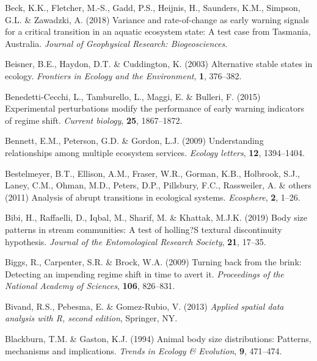 \documentclass[print]{nuthesis}
\begin{document}
\leavevmode\hypertarget{ref-beck_variance_2018}{}%
Beck, K.K., Fletcher, M.-S., Gadd, P.S., Heijnis, H., Saunders, K.M., Simpson, G.L. \& Zawadzki, A. (2018) Variance and rate-of-change as early warning signals for a critical transition in an aquatic ecosystem state: A test case from Tasmania, Australia. \emph{Journal of Geophysical Research: Biogeosciences}.

\leavevmode\hypertarget{ref-beisner2003alternative}{}%
Beisner, B.E., Haydon, D.T. \& Cuddington, K. (2003) Alternative stable states in ecology. \emph{Frontiers in Ecology and the Environment}, \textbf{1}, 376--382.

\leavevmode\hypertarget{ref-benedetti2015experimental}{}%
Benedetti-Cecchi, L., Tamburello, L., Maggi, E. \& Bulleri, F. (2015) Experimental perturbations modify the performance of early warning indicators of regime shift. \emph{Current biology}, \textbf{25}, 1867--1872.

\leavevmode\hypertarget{ref-bennett2009understanding}{}%
Bennett, E.M., Peterson, G.D. \& Gordon, L.J. (2009) Understanding relationships among multiple ecosystem services. \emph{Ecology letters}, \textbf{12}, 1394--1404.

\leavevmode\hypertarget{ref-bestelmeyer_analysis_2011}{}%
Bestelmeyer, B.T., Ellison, A.M., Fraser, W.R., Gorman, K.B., Holbrook, S.J., Laney, C.M., Ohman, M.D., Peters, D.P., Pillsbury, F.C., Rassweiler, A. \& others (2011) Analysis of abrupt transitions in ecological systems. \emph{Ecosphere}, \textbf{2}, 1--26.

\leavevmode\hypertarget{ref-bibi2019body}{}%
Bibi, H., Raffaelli, D., Iqbal, M., Sharif, M. \& Khattak, M.J.K. (2019) Body size patterns in stream communities: A test of holling?S textural discontinuity hypothesis. \emph{Journal of the Entomological Research Society}, \textbf{21}, 17--35.

\leavevmode\hypertarget{ref-biggs2009turning}{}%
Biggs, R., Carpenter, S.R. \& Brock, W.A. (2009) Turning back from the brink: Detecting an impending regime shift in time to avert it. \emph{Proceedings of the National Academy of Sciences}, \textbf{106}, 826--831.

\leavevmode\hypertarget{ref-sp2}{}%
Bivand, R.S., Pebesma, E. \& Gomez-Rubio, V. (2013) \emph{Applied spatial data analysis with R, second edition}, Springer, NY.

\leavevmode\hypertarget{ref-blackburn1994animal}{}%
Blackburn, T.M. \& Gaston, K.J. (1994) Animal body size distributions: Patterns, mechanisms and implications. \emph{Trends in Ecology \& Evolution}, \textbf{9}, 471--474.
\end{document}
